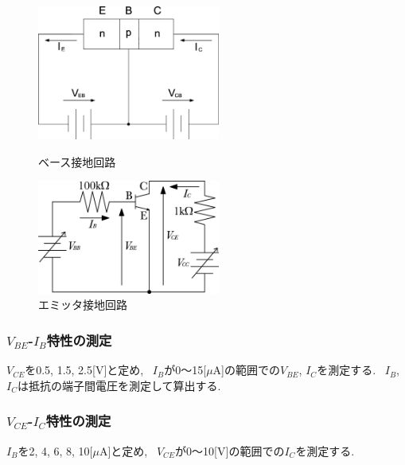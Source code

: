 \documentclass[uplatex,dvipdfmx,a4paper,js=standard, titlepage]{bxjsarticle}
\begin{document}
        \begin{figure}[ht]
            \begin{minipage}{0.5\hsize}
                \begin{center}
                    \includegraphics[width=6cm]{images/base_ground.eps}
                    \caption{ベース接地回路}
                    \label{fig:base_ground}
                \end{center}
            \end{minipage}
            \begin{minipage}{0.5\hsize}
                \begin{center}
                    \includegraphics[width=6cm]{images/emitter_ground.eps}
                    \caption{エミッタ接地回路}
                    \label{fig:emitter_ground}
                \end{center}
            \end{minipage}
        \end{figure}

        \subsubsection{$V_{BE}$-$I_B$特性の測定}
            $V_{CE}$を0.5, 1.5, 2.5[V]と定め, ~$I_B$が0〜15[$\mu$A]の範囲での$V_{BE}$, $I_C$を測定する.
            ~$I_B$, $I_C$は抵抗の端子間電圧を測定して算出する.

        \subsubsection{$V_{CE}$-$I_C$特性の測定}
            $I_B$を2, 4, 6, 8, 10[$\mu$A]と定め, ~$V_{CE}$が0〜10[V]の範囲での$I_C$を測定する.
\end{document}
